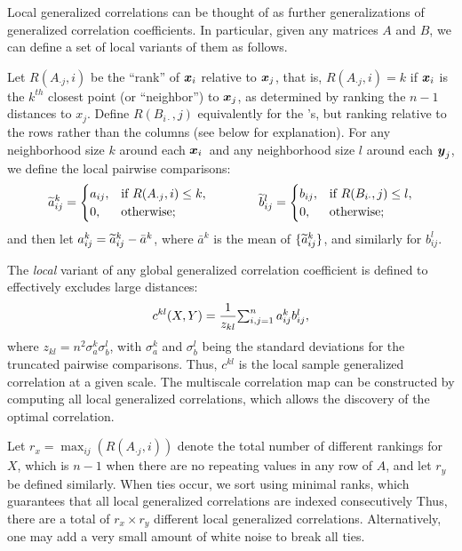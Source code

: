 \documentclass[11pt]{extarticle}
\begin{document}
Local generalized correlations can be thought of as further generalizations of generalized correlation coefficients. In particular, given any matrices $A$ and $B$, we can define a set of local variants of them as follows.

Let $R(A_{\cdot j},i)$ be the ``rank'' of $\boldsymbol{x}_i$ relative to $\boldsymbol{x}_j$, that is, $R(A_{\cdot j},i)=k$ if $\boldsymbol{x}_i$ is the $k^{th}$ closest point (or ``neighbor'') to $\boldsymbol{x}_j$, as determined by ranking the $n-1$ distances to $x_j$.
Define $R(B_{i \cdot},j)$ equivalently for the \mby's, but ranking relative to the rows rather than the columns (see below for explanation).
For any neighborhood size $k$ around each $\boldsymbol{x}_i$~and any neighborhood size $l$ around each $\boldsymbol{y}_j$, we define the local pairwise comparisons:
\begin{equation}
\label{localCoef2}
    \widetilde{a}_{ij}^k=
    \begin{cases}
      a_{ij}, & \text{if } R(A_{\cdot j},i) \leq k, \\
      0, & \text{otherwise};
    \end{cases} \qquad \qquad
    \widetilde{b}_{ij}^l=
    \begin{cases}
      b_{ij}, & \text{if } R(B_{i \cdot},j) \leq l, \\
      0, & \text{otherwise};
    \end{cases}
\end{equation}
and then let $a^k_{ij}=\widetilde{a}^k_{ij} - \bar{a}^k$,
where $\bar{a}^k$ is the mean of $\{\widetilde{a}_{ij}^{k}\}$, and similarly for $b^l_{ij}$.

The \emph{local} variant of any global generalized correlation coefficient is defined to effectively excludes large distances:
\begin{equation}
\label{localCoef}
c^{kl}(X,Y)=\dfrac{1}{z_{kl}} {\textstyle \sum_{i,j=1}^n a_{ij}^k b_{ij}^l},
\end{equation}
where $z_{kl}=n^2 \sigma_a^k \sigma_b^l$,  with $\sigma_a^k$ and $\sigma_b^{l}$ being the standard deviations for the truncated pairwise comparisons. Thus, $c^{kl}$ is the local sample generalized correlation at a given scale. The multiscale correlation map can be constructed by computing all local generalized correlations, which allows the discovery of the optimal correlation.

Let $r_x=\max_{ij} (R(A_{\cdot j},i))$ denote the total number of different rankings for $X$, which is $n-1$ when there are no repeating values in any row of $A$, and let $r_y$ be defined similarly.
When ties occur, we sort using minimal ranks, which guarantees that all local generalized correlations are indexed consecutively
Thus, there are a total of $r_x \times r_y$ different local generalized correlations.
Alternatively, one may add a very small amount of white noise to break all ties.%
\end{document}
